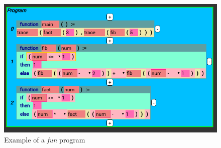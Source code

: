 \begin{figure}[H]
\centering
\includegraphics[scale=0.5]{graphics/funprog} %
\caption{Example of a \textit{fun} program}
\label{fig:funprog} %
\end{figure}

